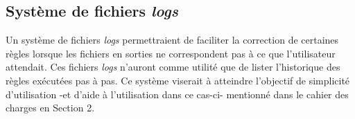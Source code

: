 	\subsection{Système de fichiers \textit{logs}}
	
		Un système de fichiers \textit{logs} permettraient de faciliter la correction de certaines règles lorsque les fichiers en sorties ne correspondent pas à ce que l'utilisateur attendait. Ces fichiers \textit{logs} n'auront comme utilité que de lister l'historique des règles exécutées pas à pas. Ce système viserait à atteindre l'objectif de simplicité d'utilisation -et d'aide à l'utilisation dans ce cas-ci- mentionné dans le cahier des charges en Section 2.